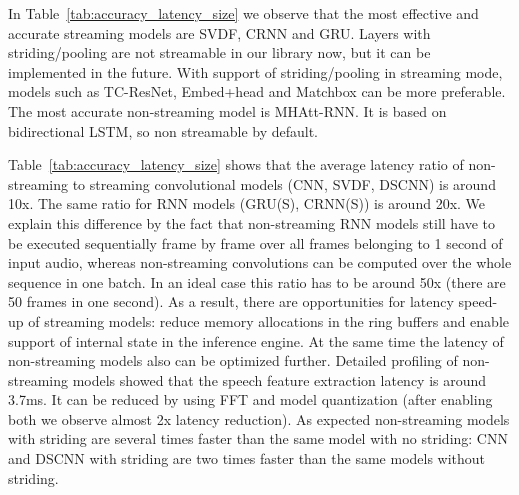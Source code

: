 \documentclass[a4paper]{article}
\begin{document}
In Table~\ref{tab:accuracy_latency_size} we observe that the most effective and accurate streaming models are SVDF, CRNN and GRU. Layers with striding/pooling are not streamable in our library now, but it can be implemented in the future. With support of striding/pooling in streaming mode, models such as TC-ResNet, Embed+head and Matchbox can be more preferable. The most accurate non-streaming model is MHAtt-RNN. It is based on bidirectional LSTM, so non streamable by default.

Table~\ref{tab:accuracy_latency_size} shows that the average latency ratio of non-streaming to streaming convolutional models (CNN, SVDF, DSCNN) is around 10x. The same ratio for RNN models (GRU(S), CRNN(S)) is around 20x. We explain this difference by the fact that non-streaming RNN models still have to be executed sequentially frame by frame over all frames belonging to 1 second of input audio, whereas non-streaming convolutions can be computed over the whole sequence in one batch. In an ideal case this ratio has to be around 50x (there are 50 frames in one second). As a result, there are opportunities for latency speed-up of streaming models: reduce memory allocations in the ring buffers and enable support of internal state in the inference engine. At the same time the latency of non-streaming models also can be optimized further. Detailed profiling of non-streaming models showed that the speech feature extraction latency is around 3.7ms. It can be reduced by using FFT and model quantization (after enabling both we observe almost 2x latency reduction). As expected non-streaming models with striding are several times faster than the same model with no striding: CNN and DSCNN with striding are two times faster than the same models without striding.
\end{document}
